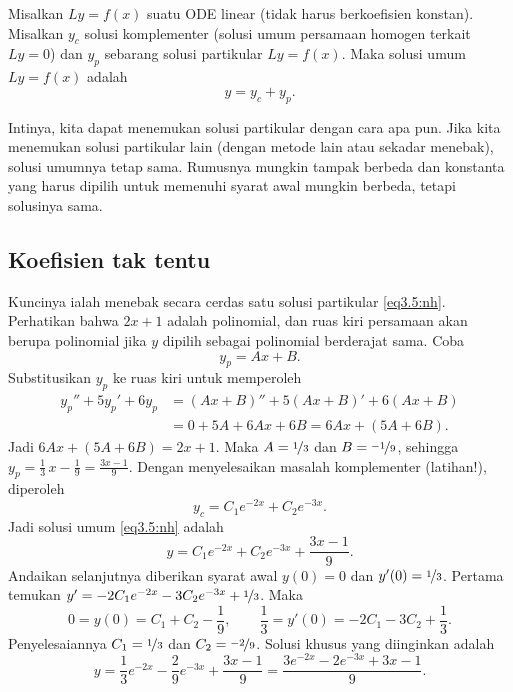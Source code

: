 \begin{theorem}
Misalkan $Ly=f(x)$ suatu ODE linear (tidak harus berkoefisien konstan). Misalkan $y_c$ solusi komplementer (solusi umum persamaan homogen terkait $Ly = 0$) dan $y_p$ sebarang solusi partikular $Ly=f(x)$. Maka solusi umum $Ly=f(x)$ adalah
\begin{equation*}
y = y_c + y_p.
\end{equation*}
\end{theorem}

Intinya, kita dapat menemukan solusi partikular dengan cara apa pun. Jika kita menemukan solusi partikular lain (dengan metode lain atau sekadar menebak), solusi umumnya tetap sama. Rumusnya mungkin tampak berbeda dan konstanta yang harus dipilih untuk memenuhi syarat awal mungkin berbeda, tetapi solusinya sama.

\subsection{Koefisien tak tentu}

Kuncinya ialah menebak secara cerdas satu solusi partikular \eqref{eq3.5:nh}. Perhatikan bahwa $2x+1$ adalah polinomial, dan ruas kiri persamaan akan berupa polinomial jika $y$ dipilih sebagai polinomial berderajat sama. Coba
\begin{equation*}
y_p = Ax + B .
\end{equation*}
Substitusikan $y_p$ ke ruas kiri untuk memperoleh
\begin{equation*}
\begin{split}
y_p'' + 5y_p'+ 6y_p & =
(Ax+B)'' + 5(Ax+B)' + 6(Ax+B)
\\
& =
0 + 5A + 6Ax + 6B = 6Ax+ (5A+6B) .
\end{split}
\end{equation*}
Jadi $6Ax+(5A+6B) = 2x+1$. Maka $A = \nicefrac{1}{3}$ dan $B = \nicefrac{-1}{9}$, sehingga $y_p = \frac{1}{3}\, x - \frac{1}{9} = \frac{3x-1}{9}$. Dengan menyelesaikan masalah komplementer (latihan!), diperoleh
\begin{equation*}
y_c = C_1 e^{-2x} + C_2 e^{-3x}.
\end{equation*}
Jadi solusi umum \eqref{eq3.5:nh} adalah
\begin{equation*}
y = C_1 e^{-2x} + C_2 e^{-3x} + \frac{3x-1}{9} .
\end{equation*}
Andaikan selanjutnya diberikan syarat awal $y(0) = 0$ dan $y'(0) = \nicefrac{1}{3}$. Pertama temukan $y' = - 2C_1 e^{-2x} - 3C_2 e^{-3x} + \nicefrac{1}{3}$. Maka
\begin{equation*}
0 = y(0) = C_1 + C_2 -\frac{1}{9} , \qquad
\frac{1}{3} = y'(0) = - 2C_1 - 3C_2 + \frac{1}{3} .
\end{equation*}
Penyelesaiannya $C_1 = \nicefrac{1}{3}$ dan $C_2 = \nicefrac{-2}{9}$. Solusi khusus yang diinginkan adalah
\begin{equation*}
y = \frac{1}{3} e^{-2x} - \frac{2}{9} e^{-3x} + \frac{3x-1}{9} =
\frac{3 e^{-2x} - 2 e^{-3x} + 3x-1}{9} .
\end{equation*}

